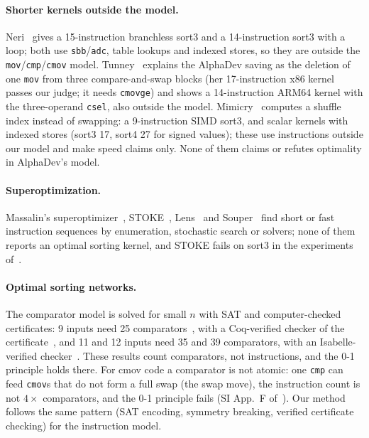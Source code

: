 \paragraph{Shorter kernels outside the model.} Neri~\cite{neri} gives a 15-instruction branchless sort3 and a 14-instruction
sort3 with a loop; both use \texttt{sbb}/\texttt{adc}, table lookups and indexed stores, so they are outside the
\texttt{mov}/\texttt{cmp}/\texttt{cmov} model. Tunney~\cite{tunney} explains the AlphaDev saving as the deletion of one
\texttt{mov} from three compare-and-swap blocks (her 17-instruction x86 kernel passes our judge; it needs \texttt{cmovge}) and
shows a 14-instruction ARM64 kernel with the three-operand \texttt{csel}, also outside the model. Mimicry~\cite{mimicry} computes
a shuffle index instead of swapping: a 9-instruction SIMD sort3, and scalar kernels with indexed stores (sort3 17, sort4 27
for signed values); these use instructions outside our model and make speed claims only. None of them claims or refutes
optimality in AlphaDev's model.

\paragraph{Superoptimization.} Massalin's superoptimizer~\cite{massalin}, STOKE~\cite{stoke}, Lens~\cite{lens} and
Souper~\cite{souper} find short or fast instruction sequences by enumeration, stochastic search or solvers; none of them reports
an optimal sorting kernel, and STOKE fails on sort3 in the experiments of~\cite{ullrich}.

\paragraph{Optimal sorting networks.} The comparator model is solved for small $n$ with SAT and computer-checked certificates:
9 inputs need 25 comparators~\cite{codish}, with a Coq-verified checker of the certificate~\cite{cruzfilipe}, and 11 and 12
inputs need 35 and 39 comparators, with an Isabelle-verified checker~\cite{harder}. These results count comparators, not
instructions, and the 0-1 principle holds there. For cmov code a comparator is not atomic: one \texttt{cmp} can feed
\texttt{cmov}s that do not form a full swap (the swap move), the instruction count is not $4 \times$ comparators, and the
0-1 principle fails (SI App.~F of~\cite{alphadev}). Our method follows the same pattern (SAT encoding, symmetry breaking,
verified certificate checking) for the instruction model.
